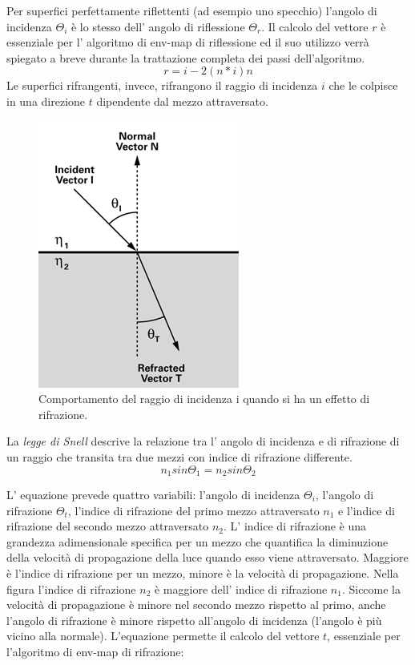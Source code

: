 Per superfici perfettamente riflettenti (ad esempio uno specchio) l’angolo di incidenza $\Theta_i$ è lo stesso dell’ angolo di riflessione $\Theta_r$.
Il calcolo del vettore $r$ è essenziale per l’ algoritmo di env-map di riflessione ed il suo utilizzo verrà spiegato a breve durante la trattazione completa dei passi dell’algoritmo.
\begin{equation}
r = i - 2(n * i)n
\end{equation}
Le superfici rifrangenti, invece, rifrangono  il raggio di incidenza $i$ che le colpisce in una direzione $t$ dipendente dal mezzo attraversato.
\\
\begin{figure}[htb]
 \centering
 \includegraphics[width=0.5\linewidth]{images/chapter_stato_arte/stato_arte_refr.png}\hfill
 \caption[Env map: rifrazione]{Comportamento del raggio di incidenza i quando si ha un effetto di rifrazione.}
 \label{fig:stato_arte_refr}
\end{figure}

La \emph{legge di Snell} descrive la relazione tra l’ angolo di incidenza e di rifrazione di un raggio che transita tra due mezzi con indice di rifrazione differente.
\begin{equation}
n_1sin\Theta_1 = n_2sin\Theta_2 
\end{equation}

L’ equazione prevede quattro variabili: l’angolo di incidenza $\Theta_i$, l’angolo di rifrazione $\Theta_t$, l’indice di rifrazione del primo mezzo attraversato $n_1$ e l’indice di rifrazione del secondo mezzo attraversato $n_2$.
L’ indice di rifrazione è una grandezza adimensionale specifica per un mezzo che quantifica la diminuzione della velocità di propagazione della luce quando esso viene attraversato. Maggiore è l’indice di rifrazione per un mezzo, minore è la velocità di propagazione.
Nella figura l’indice di rifrazione $n_2$ è maggiore dell’ indice di rifrazione $n_1$. 
Siccome la velocità di propagazione è minore nel secondo mezzo rispetto al primo, anche l’angolo di rifrazione è minore rispetto all’angolo di incidenza (l’angolo è più vicino alla normale). 
L’equazione permette il calcolo del vettore $t$, essenziale per l’algoritmo di env-map di rifrazione:

